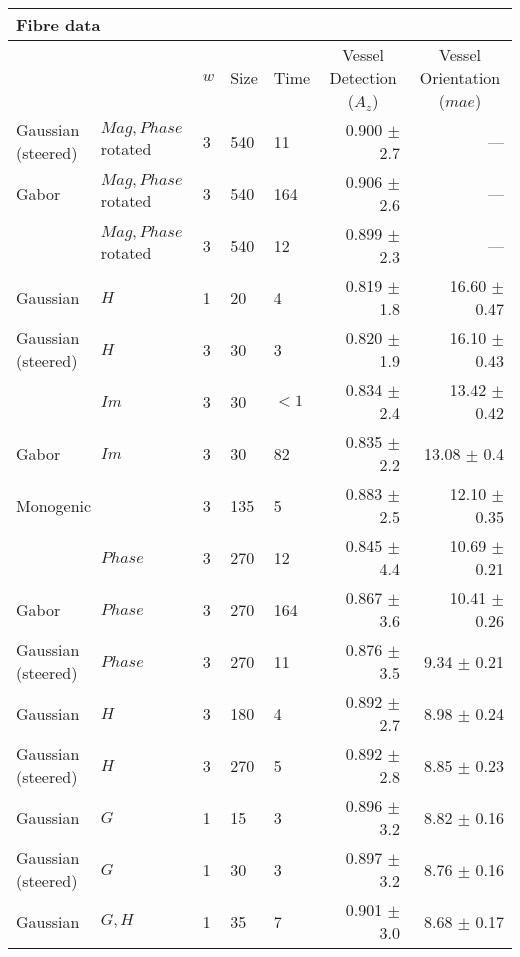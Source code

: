 \begin{tabularx}{\linewidth}{p{3cm} X X X X r r}
\toprule
\multicolumn{7}{l}{Fibre data} \\
\midrule
            &
            & $w$
            & Size
            & Time
            & \multicolumn{1}{c}{Vessel Detection \linebreak ($A_z$)}
            & \multicolumn{1}{c}{Vessel Orientation \linebreak ($mae$)}  \\

\midrule

Gaussian (steered)& $Mag, Phase$ rotated
                                    & 3 &   540 &  11   & 0.900 $\pm$ 2.7   & --- \\
Gabor   & $Mag, Phase$ rotated      & 3 &   540 & 164   & 0.906 $\pm$ 2.6   & --- \\
\dtcwt{}& $Mag, Phase$ rotated      & 3 &   540 &  12   & 0.899 $\pm$ 2.3   & --- \\

Gaussian    & $H$                   & 1 &    20 &   4   & 0.819 $\pm$ 1.8   &16.60 $\pm$ 0.47  \\
Gaussian (steered)& $H$             & 3 &    30 &   3   & 0.820 $\pm$ 1.9   &16.10 $\pm$ 0.43\\
\dtcwt{}& $Im$                      & 3 &    30 &${<}1$ & 0.834 $\pm$ 2.4   &13.42 $\pm$ 0.42 \\
Gabor   & $Im$                      & 3 &    30 &  82   & 0.835 $\pm$ 2.2   &13.08 $\pm$ 0.4  \\

\multicolumn{2}{l}{Monogenic}       & 3 &   135 &   5   & 0.883 $\pm$ 2.5   &12.10 $\pm$ 0.35 \\
\dtcwt{}& $Phase$                   & 3 &   270 &  12   & 0.845 $\pm$ 4.4   &10.69 $\pm$ 0.21 \\
Gabor   & $Phase$                   & 3 &   270 & 164   & 0.867 $\pm$ 3.6   &10.41 $\pm$ 0.26 \\

Gaussian (steered)& $Phase$         & 3 &   270 &  11   & 0.876 $\pm$ 3.5   & 9.34 $\pm$ 0.21 \\
Gaussian    & $H$                   & 3 &   180 &   4   & 0.892 $\pm$ 2.7   & 8.98 $\pm$ 0.24 \\
Gaussian (steered)& $H$             & 3 &   270 &   5   & 0.892 $\pm$ 2.8   & 8.85 $\pm$ 0.23 \\
Gaussian    & $G$                   & 1 &    15 &   3   & 0.896 $\pm$ 3.2   & 8.82 $\pm$ 0.16   \\
Gaussian (steered)& $G$             & 1 &    30 &   3   & 0.897 $\pm$ 3.2   & 8.76 $\pm$ 0.16 \\
Gaussian    & $G, H$                & 1 &    35 &   7   & 0.901 $\pm$ 3.0   & 8.68 $\pm$ 0.17   \\


\end{tabularx}
